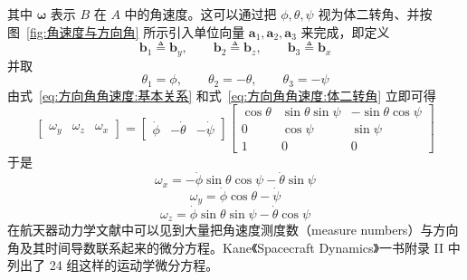 其中 $\bm{\omega}$ 表示 $B$ 在 $A$ 中的角速度。这可以通过把 $\phi,\theta,\psi$ 视为体二转角、并按图~\ref{fig:角速度与方向角} 所示引入单位向量 $\mathbf{a}_1,\mathbf{a}_2,\mathbf{a}_3$ 来完成，即定义
\begin{equation}
    \mathbf{b}_1 \triangleq \mathbf{b}_y,\qquad
    \mathbf{b}_2 \triangleq \mathbf{b}_z,\qquad
    \mathbf{b}_3 \triangleq \mathbf{b}_x
    \label{eq:方向角角速度:置换}
\end{equation}
并取
\begin{equation}
    \theta_1 = \phi,\qquad \theta_2 = -\theta,\qquad \theta_3 = -\psi
    \label{eq:方向角角速度:角度对应}
\end{equation}
由式~\eqref{eq:方向角角速度:基本关系} 和式~\eqref{eq:方向角角速度:体二转角} 立即可得
\begin{equation}
    \begin{bmatrix}\omega_y & \omega_z & \omega_x\end{bmatrix}
    = \begin{bmatrix}\dot{\phi} & -\dot{\theta} & -\dot{\psi}\end{bmatrix}
    \begin{bmatrix}
        \cos\theta & \sin\theta\sin\psi & -\sin\theta\cos\psi\\
        0 & \cos\psi & \sin\psi\\
        1 & 0 & 0
    \end{bmatrix}
    \label{eq:方向角角速度:圆锥关系}
\end{equation}
于是
\begin{equation}
    \omega_x = -\dot{\phi}\sin\theta\cos\psi - \dot{\theta}\sin\psi
\end{equation}
\begin{equation}
    \omega_y = \dot{\phi}\cos\theta - \dot{\psi}
\end{equation}
\begin{equation}
    \omega_z = \dot{\phi}\sin\theta\sin\psi - \dot{\theta}\cos\psi
\end{equation}
在航天器动力学文献中可以见到大量把角速度测度数（measure numbers）与方向角及其时间导数联系起来的微分方程。Kane《Spacecraft Dynamics》一书附录 II 中列出了 24 组这样的运动学微分方程。

